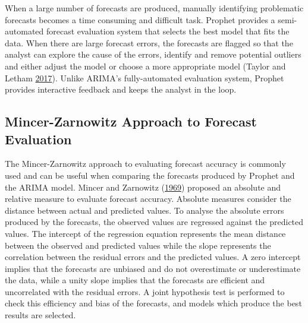 \documentclass[12pt,preprint, authoryear]{elsarticle}
\numberwithin{equation}{section}
\numberwithin{figure}{section}
\numberwithin{table}{section}
\begin{document}
When a large number of forecasts are produced, manually identifying
problematic forecasts becomes a time consuming and difficult task.
Prophet provides a semi-automated forecast evaluation system that
selects the best model that fits the data. When there are large forecast
errors, the forecasts are flagged so that the analyst can explore the
cause of the errors, identify and remove potential outliers and either
adjust the model or choose a more appropriate model (Taylor and Letham
\protect\hyperlink{ref-taylor2017}{2017}). Unlike ARIMA's
fully-automated evaluation system, Prophet provides interactive feedback
and keeps the analyst in the loop.

\subsection{Mincer-Zarnowitz Approach to Forecast
Evaluation}\label{mincer-zarnowitz-approach-to-forecast-evaluation}

The Mincer-Zarnowitz approach to evaluating forecast accuracy is
commonly used and can be useful when comparing the forecasts produced by
Prophet and the ARIMA model. Mincer and Zarnowitz
(\protect\hyperlink{ref-mincer1969}{1969}) proposed an absolute and
relative measure to evaluate forecast accuracy. Absolute measures
consider the distance between actual and predicted values. To analyse
the absolute errors produced by the forecasts, the observed values are
regressed against the predicted values. The intercept of the regression
equation represents the mean distance between the observed and predicted
values while the slope represents the correlation between the residual
errors and the predicted values. A zero intercept implies that the
forecasts are unbiased and do not overestimate or underestimate the
data, while a unity slope implies that the forecasts are efficient and
uncorrelated with the residual errors. A joint hypothesis test is
performed to check this efficiency and bias of the forecasts, and models
which produce the best results are selected.
\end{document}
